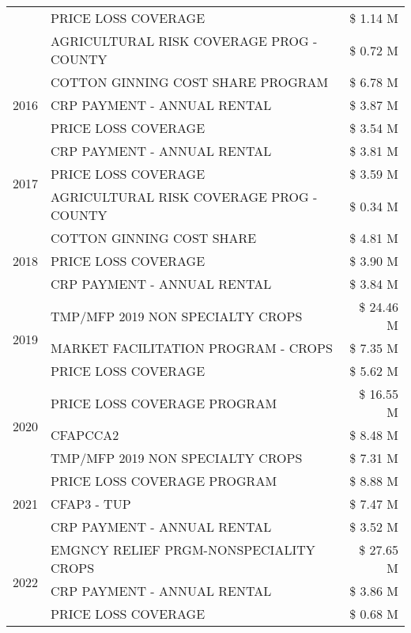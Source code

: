 \begin{tabular}{llr}
 & PRICE LOSS COVERAGE & \$ 1.14 M \\
 & AGRICULTURAL RISK COVERAGE PROG - COUNTY & \$ 0.72 M \\
\cline{1-3}
\multirow[t]{3}{*}{2016} & COTTON GINNING COST SHARE PROGRAM & \$ 6.78 M \\
 & CRP PAYMENT - ANNUAL RENTAL & \$ 3.87 M \\
 & PRICE LOSS COVERAGE & \$ 3.54 M \\
\cline{1-3}
\multirow[t]{3}{*}{2017} & CRP PAYMENT - ANNUAL RENTAL & \$ 3.81 M \\
 & PRICE LOSS COVERAGE & \$ 3.59 M \\
 & AGRICULTURAL RISK COVERAGE PROG - COUNTY & \$ 0.34 M \\
\cline{1-3}
\multirow[t]{3}{*}{2018} & COTTON GINNING COST SHARE & \$ 4.81 M \\
 & PRICE LOSS COVERAGE & \$ 3.90 M \\
 & CRP PAYMENT - ANNUAL RENTAL & \$ 3.84 M \\
\cline{1-3}
\multirow[t]{3}{*}{2019} & TMP/MFP 2019 NON SPECIALTY CROPS & \$ 24.46 M \\
 & MARKET FACILITATION PROGRAM - CROPS & \$ 7.35 M \\
 & PRICE LOSS COVERAGE & \$ 5.62 M \\
\cline{1-3}
\multirow[t]{3}{*}{2020} & PRICE LOSS COVERAGE PROGRAM & \$ 16.55 M \\
 & CFAPCCA2 & \$ 8.48 M \\
 & TMP/MFP 2019 NON SPECIALTY CROPS & \$ 7.31 M \\
\cline{1-3}
\multirow[t]{3}{*}{2021} & PRICE LOSS COVERAGE PROGRAM & \$ 8.88 M \\
 & CFAP3 - TUP & \$ 7.47 M \\
 & CRP PAYMENT - ANNUAL RENTAL & \$ 3.52 M \\
\cline{1-3}
\multirow[t]{3}{*}{2022} & EMGNCY RELIEF PRGM-NONSPECIALITY CROPS & \$ 27.65 M \\
 & CRP PAYMENT - ANNUAL RENTAL & \$ 3.86 M \\
 & PRICE LOSS COVERAGE & \$ 0.68 M \\
\cline{1-3}
\bottomrule
\end{tabular}
